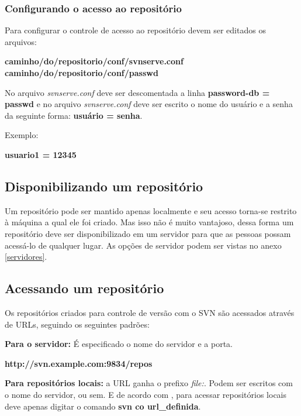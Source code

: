 \subsubsection{Configurando o acesso ao repositório}
\label{secao_acesso}
Para configurar o controle de acesso ao repositório devem ser editados os arquivos: \cite{wiki-svn}

\begin{centering}
\colorbox{PineGreen}{
\begin{minipage}{250px}
  \textbf{caminho/do/repositorio/conf/svnserve.conf}
  \textbf{caminho/do/repositorio/conf/passwd}
\end{minipage}
}
\end{centering}

No arquivo \textit{svnserve.conf} deve ser descomentada a linha \textbf{password-db = passwd} e no arquivo \textit{svnserve.conf}
deve ser escrito o nome do usuário e a senha da seguinte forma: \textbf{usuário = senha}. \cite{wiki-svn}

\begin{centering}
Exemplo:

\colorbox{PineGreen}{
\begin{minipage}{100px}

  \textbf{usuario1 = 12345}
\end{minipage}
}
\end{centering}

\subsection{Disponibilizando um repositório}

Um repositório pode ser mantido apenas localmente e seu acesso torna-se restrito à máquina a qual ele foi criado. Mas isso não é muito vantajoso, dessa forma um repositório deve ser disponibilizado em um servidor para que as pessoas possam acessá-lo de qualquer lugar. As opções de servidor podem ser vistas no anexo \ref{servidores}. 

\subsection{Acessando um repositório}

  Os repositórios criados para controle de versão com o SVN são acessados através de URLs, seguindo os seguintes padrões: \cite{svn-book}

\begin{centering}

\textbf{Para o servidor:} É especificado o nome do servidor e a porta.

\colorbox{PineGreen}{
\begin{minipage}{220px}
  \textbf{http://svn.example.com:9834/repos}
\end{minipage}
}

\textbf{Para repositórios locais:} a URL ganha o prefixo \textit{file:}. Podem ser escritos com o nome do servidor, ou sem. E de acordo com , para acessar repositórios locais deve apenas digitar o comando \textbf{svn co url\_definida}.
\end{centering}

